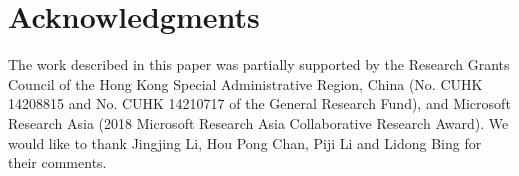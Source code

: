 \documentclass[letterpaper]{article} %
\begin{document}
\section{Acknowledgments}
The work described in this paper was partially supported
by the Research Grants Council of the Hong
Kong Special Administrative Region, China (No. CUHK
14208815 and No. CUHK 14210717 of the General Research
Fund), and Microsoft Research Asia (2018 Microsoft
Research Asia Collaborative Research Award). We would like to thank Jingjing Li, Hou Pong Chan, Piji Li and Lidong Bing for their comments.

\fontsize{9.0pt}{10.0pt} \selectfont


\end{document}
